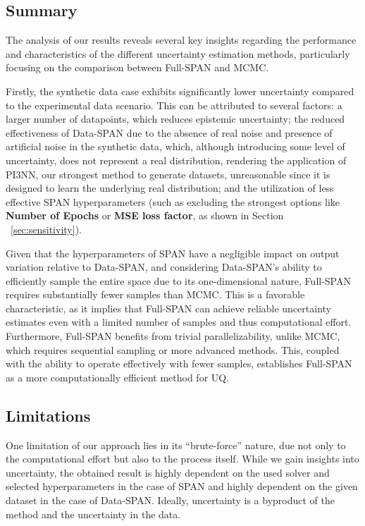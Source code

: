 \subsection{Summary}
The analysis of our results reveals several key insights regarding the performance and characteristics of the different uncertainty estimation methods, particularly focusing on the comparison between Full-SPAN and MCMC.

Firstly, the synthetic data case exhibits significantly lower uncertainty compared to the experimental data scenario. This can be attributed to several factors: a larger number of datapoints, which reduces epistemic uncertainty; the reduced effectiveness of Data-SPAN due to the absence of real noise and presence of artificial noise in the synthetic data, which, although introducing some level of uncertainty, does not represent a real distribution, rendering the application of PI3NN, our strongest method to generate datasets, unreasonable since it is designed to learn the underlying real distribution; and the utilization of less effective SPAN hyperparameters (such as excluding the strongest options like \textbf{Number of Epochs} or \textbf{MSE loss factor}, as shown in Section ~\vref{sec:sensitivity}).

Given that the hyperparameters of SPAN have a negligible impact on output variation relative to Data-SPAN, and considering Data-SPAN's ability to efficiently sample the entire space due to its one-dimensional nature, Full-SPAN requires substantially fewer samples than MCMC. This is a favorable characteristic, as it implies that Full-SPAN can achieve reliable uncertainty estimates even with a limited number of samples and thus computational effort. Furthermore, Full-SPAN benefits from trivial parallelizability, unlike MCMC, which requires sequential sampling or more advanced methods. This, coupled with the ability to operate effectively with fewer samples, establishes Full-SPAN as a more computationally efficient method for UQ.









\subsection{Limitations}
One limitation of our approach lies in its ``brute-force'' nature, due not only to the computational effort but also to the process itself. While we gain insights into uncertainty, the obtained result is highly dependent on the used solver and selected hyperparameters in the case of SPAN and highly dependent on the given dataset in the case of Data-SPAN. Ideally, uncertainty is a byproduct of the method and the uncertainty in the data.

